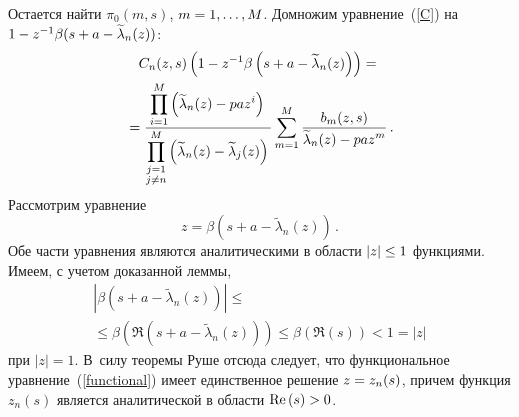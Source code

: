 \begin{multicols}{2}
Остается найти $\pi_0(m,s)$, $m\hm=1,\ldots,M$. Домножим
уравнение~(\ref{C}) на
$1\hm-z^{-1}\beta(s\hm+a\hm-\widetilde{\lambda}_n(z))$:
\begin{multline}
C_n(z,s)\left(1-z^{-1}\beta\left(s+a-\widetilde{\lambda}_n(z)\right)\right)={}\\
{}=
\displaystyle\frac{\displaystyle \prod\limits_{i=1}^M\left(\widetilde{\lambda}_n(z)-paz^i\right)\mathstrut}{\displaystyle \prod\limits_{\substack{j=1\\j\neq n}}^M
\left(\widetilde{\lambda}_n(z)-
\widetilde{\lambda}_j(z)\right)\mathstrut}
\sum\limits_{m=1}^M\displaystyle\frac{\displaystyle b_m(z,s)\mathstrut}{\displaystyle \widetilde{\lambda}_n(z)-paz^m\mathstrut}\,.
\label{findpi1}
\end{multline}
Рассмотрим уравнение
\begin{equation}
z=\beta(s+a-\widetilde{\lambda}_n(z))\,.\label{functional}
\end{equation}
Обе части уравнения являются аналитическими в области $|z|\hm\leq 1$ функциями.
Имеем, с учетом доказанной леммы,
\begin{multline*}
\left\vert \beta\left(s+a-\widetilde{\lambda}_n(z)\right)\right\vert
\leq{}\\
{}\leq \beta\left(\Re\left(s+a-\widetilde{\lambda}_n(z)\right)\right)
\leq\beta(\Re(s))<1=|z|
\end{multline*}
при $|z|=1$. В~силу теоремы Руше отсюда следует, что функциональное
уравнение~(\ref{functional}) имеет единственное решение $z\hm=z_n(s)$,
причем функция $z_n(s)$ является аналитической в области $\Re(s)\hm>0$.


\end{multicols}
